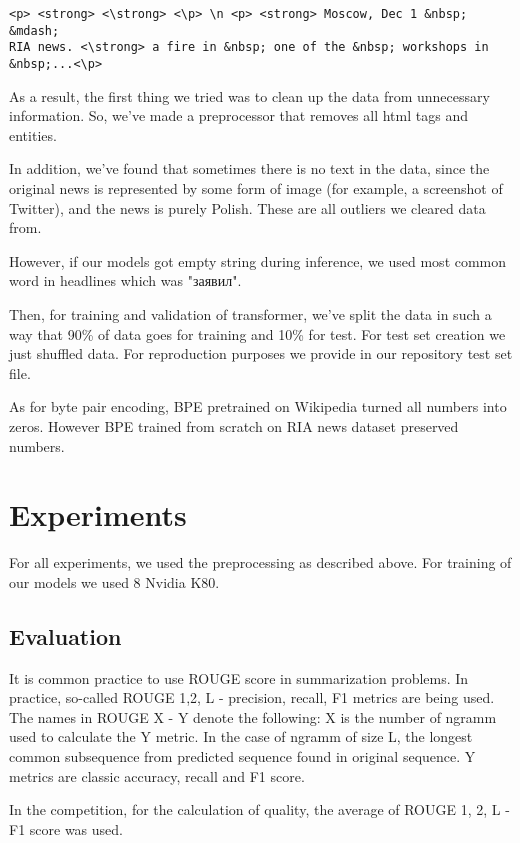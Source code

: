 \documentclass{dialogue}
\begin{document}
\begin{verbatim}
<p> <strong> <\strong> <\p> \n <p> <strong> Moscow, Dec 1 &nbsp; &mdash;
RIA news. <\strong> a fire in &nbsp; one of the &nbsp; workshops in
&nbsp;...<\p>
\end{verbatim}

As a result, the first thing we tried was to clean up the data from unnecessary information. So, we've made a preprocessor that removes all html tags and entities.

In addition, we've found that sometimes there is no text in the data, since the original news is represented by some form of image (for example, a screenshot of Twitter), and the news is purely Polish. These are all outliers we cleared data from.

However, if our models got empty string during inference, we used most common word in headlines which was "заявил".

Then, for training and validation of transformer, we've split the data in such a way that 90\% of data goes for training and 10\% for test. For test set creation we just shuffled data. For reproduction purposes we provide in our repository test set file.

As for byte pair encoding, BPE pretrained on Wikipedia turned all numbers into zeros. However BPE trained from scratch on RIA news dataset preserved numbers.

\section{Experiments}
For all experiments, we used the preprocessing as described above. For training of our models we used 8 Nvidia K80.

\subsection{Evaluation}
It is common practice to use ROUGE score \cite{Lin:2004} in summarization problems. In practice, so-called ROUGE 1,2, L - precision, recall, F1 metrics are being used. The names in ROUGE X - Y denote the following: X is the number of ngramm used to calculate the Y metric. In the case of ngramm of size L, the longest common subsequence from predicted sequence found in original sequence. Y metrics are classic accuracy, recall and F1 score.

In the competition, for the calculation of quality, the average of ROUGE 1, 2, L - F1 score was used.
\end{document}
